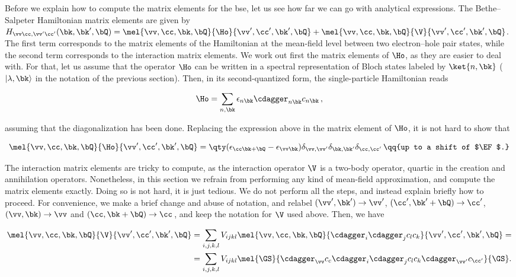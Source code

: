 Before we explain how to compute the matrix elements for the \gls{bse}, let us see how far we can go with analytical expressions.
The Bethe--Salpeter Hamiltonian matrix elements are given by $H_{\vv \cc , \vv ' \cc '}(\bk,\bk',\bQ) = \mel{\vv,\cc ,\bk,\bQ}{\Ho}{\vv ', \cc ',\bk',\bQ} + \mel{\vv,\cc ,\bk,\bQ}{\V}{\vv ', \cc ',\bk',\bQ}$.
The first term corresponds to the matrix elements of the Hamiltonian at the mean-field level between two electron--hole pair states, while the second term corresponds to the interaction matrix elements.
We work out first the matrix elements of $\Ho$, as they are easier to deal with.
For that, let us assume that the operator $\Ho$ can be written in a spectral representation of Bloch states labeled by $\ket{n,\bk}$ ($|\lambda, \bk \rangle$ in the notation of the previous section).
Then, in its second-quantized form, the single-particle Hamiltonian reads

\begin{equation}
   \Ho = \sum_{n,\bk} \epsilon_{n \bk} \cdagger_{n \bk} c_{n \bk}\,,
\label{eq:Hamiltonian_single_particle}
\end{equation}

\noindent assuming that the diagonalization has been done.
Replacing the expression above in the matrix element of $\Ho$, it is not hard to show that

\begin{equation}
    \label{eq:single_particle_matrix_element}
    \mel{\vv,\cc ,\bk,\bQ}{\Ho}{\vv ', \cc ',\bk',\bQ} = \qty(\epsilon_{\cc  \bk + \bQ} - \epsilon_{\vv \bk}) \delta_{\vv, \vv '} \delta_{\bk,\bk'} \delta_{\cc , \cc '}\, \qq{up to a shift of $\EF$.}
\end{equation}

The interaction matrix elements are tricky to compute, as the interaction operator $\V$ is a two-body operator, quartic in the creation and annihilation operators.
Nonetheless, in this section we refrain from performing any kind of mean-field approximation, and compute the matrix elements exactly.
Doing so is not hard, it is just tedious.
We do not perform all the steps, and instead explain briefly how to proceed.
For convenience, we make a brief change and abuse of notation, and relabel $(\vv ',\bk') \to \vv '$, $(\cc ',\bk' + \bQ) \to \cc'$, $(\vv,\bk) \to \vv $ and $(\cc ,\bk + \bQ) \to \cc $\,, and keep the notation for $\V$ used above.
Then, we have

\begin{align*}
    \mel{\vv,\cc ,\bk,\bQ}{\V}{\vv ', \cc ',\bk',\bQ} &= \sum_{i,j,k,l} V_{i j k l} \mel{\vv,\cc ,\bk,\bQ}{\cdagger_i \cdagger_j c_l c_k}{\vv ', \cc ',\bk',\bQ} = \\
    &= \sum_{i,j,k,l} V_{ijkl} \mel{\GS}{\cdagger_{\vv } c_c \cdagger_i \cdagger_j c_l c_k \cdagger_{\vv '} c_{\cc '}}{\GS} .
\end{align*}

